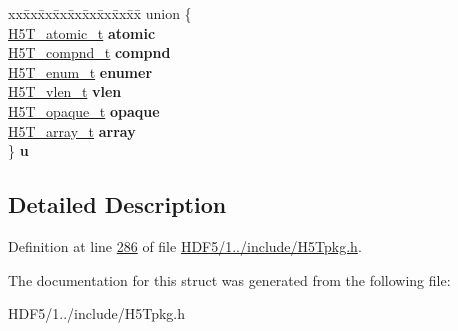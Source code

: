 \begin{DoxyCompactItemize}
\begin{tabbing}
\end{tabbing}\item 
\mbox{\label{struct_h5_t__shared__t_a7d0b7643e72990da372c8a6421a906c8}} 
\begin{tabbing}
xx\=xx\=xx\=xx\=xx\=xx\=xx\=xx\=xx\=\kill
union \{\\
\>\hyperlink{struct_h5_t__atomic__t}{H5T\_atomic\_t} {\bfseries atomic}\\
\>\hyperlink{struct_h5_t__compnd__t}{H5T\_compnd\_t} {\bfseries compnd}\\
\>\hyperlink{struct_h5_t__enum__t}{H5T\_enum\_t} {\bfseries enumer}\\
\>\hyperlink{struct_h5_t__vlen__t}{H5T\_vlen\_t} {\bfseries vlen}\\
\>\hyperlink{struct_h5_t__opaque__t}{H5T\_opaque\_t} {\bfseries opaque}\\
\>\hyperlink{struct_h5_t__array__t}{H5T\_array\_t} {\bfseries array}\\
\} {\bfseries u}\\

\end{tabbing}\end{DoxyCompactItemize}


\subsection{Detailed Description}


Definition at line \hyperlink{_h_d_f5_21_810_81_2include_2_h5_tpkg_8h_source_l00286}{286} of file \hyperlink{_h_d_f5_21_810_81_2include_2_h5_tpkg_8h_source}{H\+D\+F5/1../include/\+H5\+Tpkg.\+h}.



The documentation for this struct was generated from the following file\+:\begin{DoxyCompactItemize}
\item 
H\+D\+F5/1../include/\+H5\+Tpkg.\+h\end{DoxyCompactItemize}
